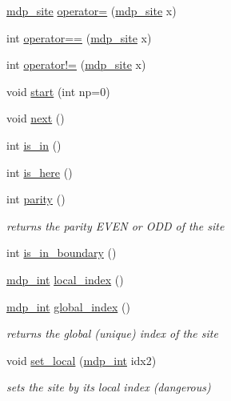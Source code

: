 \begin{DoxyCompactItemize}
\item 
\hyperlink{classmdp__site}{mdp\+\_\+site} \hyperlink{classmdp__site_aee55a3c862cb667839be5febd37b1791}{operator=} (\hyperlink{classmdp__site}{mdp\+\_\+site} x)
\item 
int \hyperlink{classmdp__site_a171afa9aeee40776c4ee8405fba525aa}{operator==} (\hyperlink{classmdp__site}{mdp\+\_\+site} x)
\item 
int \hyperlink{classmdp__site_af393fef955cb91629ece72746a582236}{operator!=} (\hyperlink{classmdp__site}{mdp\+\_\+site} x)
\item 
void \hyperlink{classmdp__site_a67f09ac8f2c14dc4461120244443532e}{start} (int np=0)
\item 
void \hyperlink{classmdp__site_a19445777d77aaf38ff3bd15d48c7c683}{next} ()
\item 
int \hyperlink{classmdp__site_a57ff5d47780a90ad36c9368360ad2d89}{is\+\_\+in} ()
\item 
int \hyperlink{classmdp__site_a1457471b74c722514712f1efb1093f63}{is\+\_\+here} ()
\item 
int \hyperlink{classmdp__site_a0b36dc1179dac2b0737dda900f135194}{parity} ()
\begin{DoxyCompactList}\small\item\em returns the parity E\+V\+EN or O\+DD of the site \end{DoxyCompactList}\item 
int \hyperlink{classmdp__site_a57188578cccbd53d6ff5ef5b791d32a4}{is\+\_\+in\+\_\+boundary} ()
\item 
\hyperlink{mdp__global__vars_8h_aaa1ad9d0dcd2124aa5af0120d9954174}{mdp\+\_\+int} \hyperlink{classmdp__site_a4a19d418044e9bf5e285998676df6f43}{local\+\_\+index} ()
\item 
\hyperlink{mdp__global__vars_8h_aaa1ad9d0dcd2124aa5af0120d9954174}{mdp\+\_\+int} \hyperlink{classmdp__site_aff34724d521041f255daf4fad09a0408}{global\+\_\+index} ()
\begin{DoxyCompactList}\small\item\em returns the global (unique) index of the site \end{DoxyCompactList}\item 
void \hyperlink{classmdp__site_a9545484331e101ce177d0877df305cbe}{set\+\_\+local} (\hyperlink{mdp__global__vars_8h_aaa1ad9d0dcd2124aa5af0120d9954174}{mdp\+\_\+int} idx2)
\begin{DoxyCompactList}\small\item\em sets the site by its local index (dangerous) \end{DoxyCompactList}\item 

\end{DoxyCompactItemize}
